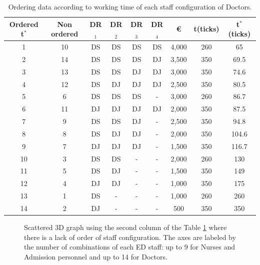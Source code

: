 \documentclass[11pt]{article} %
\begin{document}
\begin{table}[htb!]
\caption{Ordering data according to working time of each staff configuration of Doctors.}
\begin{center}
\resizebox{3.8in}{!}  {
\begin{tabular}{ccccccccc}
\hline
\bf {Ordered t$^*$ } &  \bf {Non ordered} & \bf {DR$_1$} & \bf {DR$_2$} & \bf {DR$_3$} & \bf {DR$_4$} & \bf {\euro} & \bf {t(ticks)}  &  \bf {t$^*$ (ticks)}  \\ \hline
1 & 10& DS & DS & DS & DS & 4,000 & 260 & 65  \\ \hline
2 & 14& DS & DS & DS & DJ & 3,500 & 350 & 69.5  \\ \hline
3 & 13& DS & DS & DJ & DJ & 3,000 & 350 & 74.6  \\ \hline
4 & 12& DS & DJ & DJ & DJ & 2,500 & 350 & 80.5  \\ \hline
5 & 6& DS & DS & DS & -  & 3,000 & 260 & 86.7  \\ \hline
6 & 11& DJ & DJ & DJ & DJ & 2,000 & 350 & 87.5  \\ \hline
7 & 9& DS & DS & DJ & - & 2,500 & 350 & 94.8  \\ \hline
8 & 8& DS & DJ & DJ & - & 2,000 & 350 & 104.6  \\ \hline
9 & 7& DJ & DJ & DJ & - & 1,500 & 350 & 116.7  \\ \hline
10 & 3& DS & DS & - & - & 2,000 & 260 & 130  \\ \hline
11 & 5& DS & DJ & - & - & 1,500 & 350 & 149  \\ \hline
12 & 4& DJ & DJ & - & - & 1,000 & 350 & 175  \\ \hline
13 & 1& DS & -  & - & -& 1,000 & 260 & 260  \\ \hline
14 & 2& DJ & -  & - & -  & 500 & 350 & 350  \\ \hline
\end{tabular}
}
\end{center}
\label{tab:doc_ord}
\end{table}

\begin{figure}[htb!]
{\par}
\caption{Scattered  3D graph using the second column of the Table  \ref{tab:doc_ord} where there is a lack of order of staff configuration. The axes are labeled by the number of combinations of each ED staff: up to 9 for Nurses and Admission personnel and up to 14 for Doctors.}
\label{fig:w_out_order}
\end{figure}
\end{document}
